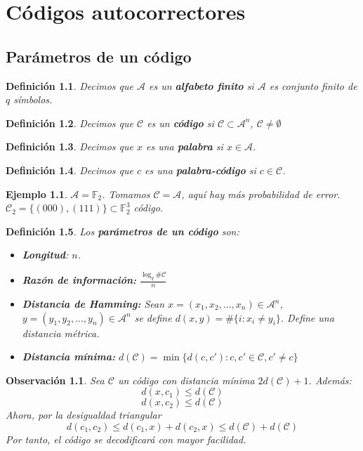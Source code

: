 \documentclass[spanish]{book}
\newtheorem{mydef}{Definición}
\newtheorem{ejem}{Ejemplo}
\newtheorem{obsv}{Observación}
\begin{document}
\chapter{Códigos autocorrectores}
\section{Parámetros de un código}
\begin{mydef}
	Decimos que $\mathcal{A}$ es un \textbf{alfabeto finito} si $\mathcal{A}$ es conjunto finito de $q$ símbolos.
\end{mydef}
\begin{mydef}
	Decimos que $\mathcal{C}$ es un \textbf{código} si $\mathcal{C} \subset \mathcal{A}^n$, $\mathcal{C} \neq \emptyset$
\end{mydef}
\begin{mydef}
	Decimos que $x$ es una \textbf{palabra} si $x \in \mathcal{A}$.
\end{mydef}
\begin{mydef}
	Decimos que $c$ es una \textbf{palabra-código} si $c \in \mathcal{C}$.
\end{mydef}

\begin{ejem}
	$\mathcal{A}=\mathbb{F}_2$. 
	Tomamos $\mathcal{C}=\mathcal{A}$, aquí hay más probabilidad de error. 
	$\mathcal{C}_2=\{( 0 0 0 ), (1 1 1)\} \subset \mathbb{F}_2^3$ código.
\end{ejem}

\begin{mydef}
	Los \textbf{parámetros de un código} son: 
	\begin{itemize}
		\item \textbf{Longitud}: $n$.
		\item  \textbf{Razón de información: } $\displaystyle \frac{\log_q{\# \mathcal{C}}}{n}$
		
		\item \textbf{Distancia de Hamming: } Sean $x=(x_1, x_2, ..., x_n) \in \mathcal{A}^n$, $y=(y_1, y_2, ..., y_n) \in \mathcal{A}^n$ se define $d(x, y)= \#\{i : x_i \neq y_i \}$. Define una distancia métrica.
		\item \textbf{Distancia mínima: } $d(\mathcal{C})= \min\{d(c, c') : c, c' \in \mathcal{C}, c' \neq c\}$
	\end{itemize}
\end{mydef}

\begin{obsv}
	Sea $\mathcal{C}$ un código con distancia mínima $2d(\mathcal{C})+1$.
	Además:
	$$ d(x, c_1) \leq d(\mathcal{C}) $$
	$$ d(x, c_2) \leq d(\mathcal{C}) $$
	Ahora, por la desigualdad triangular $$d(c_1, c_2) \leq d(c_1, x) + d(c_2, x) \leq d(\mathcal{C}) + d(\mathcal{C})$$
	Por tanto, el código se decodificará con mayor facilidad.
\end{obsv}
\end{document}
